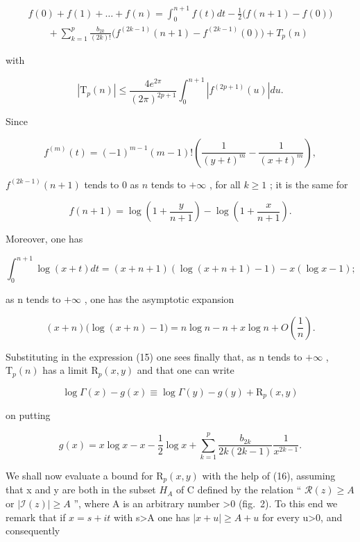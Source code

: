 \[
\begin{array}{l} f (0) + f (1) + \dots + f (n) = \int_ {0} ^ {n + 1} f (t) d t - \frac {1}{2} \big (f (n + 1) - f (0) \big) \\ \qquad + \sum_ {k = 1} ^ {p} \frac {b _ {2 k}}{(2 k) !} \big (f ^ {(2 k - 1)} (n + 1) - f ^ {(2 k - 1)} (0) \big) + T _ {p} (n) \end{array}
\]

with

\[
\left| \mathrm{T} _ {p} (n) \right| \leqslant \frac {4 e ^ {2 \pi}}{(2 \pi) ^ {2 p + 1}} \int_ {0} ^ {n + 1} \left| f ^ {(2 p + 1)} (u) \right| d u.\tag{16}
\]

Since

\[
f ^ {(m)} (t) = (- 1) ^ {m - 1} (m - 1)! \left(\frac {1}{(y + t) ^ {m}} - \frac {1}{(x + t) ^ {m}}\right),
\]

\(f^{(2k - 1)}(n + 1)\) tends to 0 as \(n\) tends to \(+\infty\) , for all \(k \geqslant 1\) ; it is the same for

\[
f (n + 1) = \log \left(1 + \frac {y}{n + 1}\right) - \log \left(1 + \frac {x}{n + 1}\right).
\]

Moreover, one has

\[
\int_ {0} ^ {n + 1} \log (x + t) d t = (x + n + 1) (\log (x + n + 1) - 1) - x (\log x - 1);
\]

as n tends to \(+\infty\) , one has the asymptotic expansion

\[
(x + n) \bigl (\log (x + n) - 1 \bigr) = n \log n - n + x \log n + O \left(\frac {1}{n}\right).
\]

Substituting in the expression (15) one sees finally that, as n tends to \(+\infty\) , \(\mathrm{T}_{p}(n)\) has a limit \(\mathrm{R}_{p}(x, y)\) and that one can write

\[
\log \Gamma (x) - g (x) \equiv \log \Gamma (y) - g (y) + \mathrm{R} _ {p} (x, y)\tag{mod.  \( 2\pi i \)}
\]

on putting

\[
g (x) = x \log x - x - \frac {1}{2} \log x + \sum_ {k = 1} ^ {p} \frac {b _ {2 k}}{2 k (2 k - 1)} \frac {1}{x ^ {2 k - 1}}.\tag{17}
\]

We shall now evaluate a bound for \(\mathrm{R}_{p}(x,y)\) with the help of (16), assuming that x and y are both in the subset \(H_{A}\) of C defined by the relation `` \(\mathcal{R}(z)\geqslant A\) or \(|\mathcal{I}(z)|\geqslant A\) '', where A is an arbitrary number \textgreater0 (fig.~2). To this end we remark that if \(x=s+it\) with s\textgreater A one has \(|x+u|\geqslant A+u\) for every u\textgreater0, and consequently

